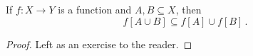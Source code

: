 \guard




\begin{prop}
\label{prop:functionAppliedToUnionIsUnionOfFunctionApplied}
  If $f:X\to Y$ is a function and $A,B\subseteq X$, then \[ f[A\cup B ]\subseteq f[A]\cup f[B]\,.\]
\end{prop}
\begin{proof}
  Left as an exercise to the reader.
\end{proof}
